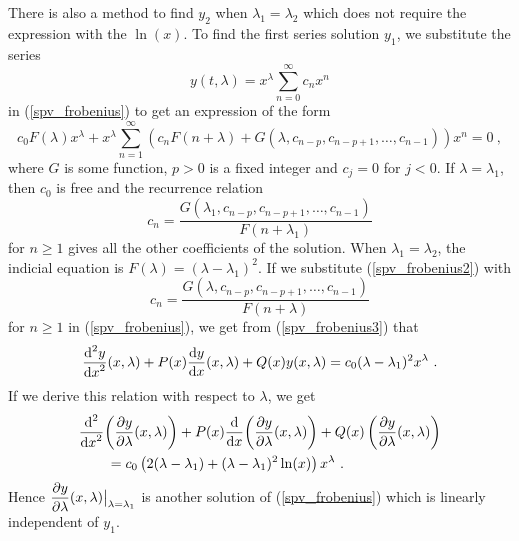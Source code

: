 There is also a method to find $y_2$ when $\lambda_1=\lambda_2$ which
does not require the expression with the $\ln(x)$.  To find the
first series solution $y_1$, we substitute the series
\begin{equation} \label{spv_frobenius2}
y(t,\lambda) = x^\lambda \sum_{n=0}^\infty c_n x^n 
\end{equation}
in (\ref{spv_frobenius}) to get an expression of the form
\begin{equation} \label{spv_frobenius3}
c_0 F(\lambda) x^\lambda + x^\lambda \sum_{n=1}^\infty
\left(c_n F(n+\lambda) +
G(\lambda,c_{n-p},c_{n-p+1},\ldots,c_{n-1})\right) x^n = 0 \  ,
\end{equation}
where $G$ is some function, $p>0$ is a fixed integer and $c_j = 0$ for
$j<0$.  If $\lambda=\lambda_1$, then $c_0$ is free and the recurrence
relation
\[
c_n = \frac{G(\lambda_1,c_{n-p},c_{n-p+1},\ldots,c_{n-1})}
{F(n+\lambda_1)}
\]
for $n\geq 1$ gives all the other coefficients of the solution.  When
$\lambda_1=\lambda_2$, the indicial equation is
$\displaystyle F(\lambda) = (\lambda-\lambda_1)^2$.  If we substitute
(\ref{spv_frobenius2}) with
\[
c_n = \frac{G(\lambda,c_{n-p},c_{n-p+1},\ldots,c_{n-1})}{F(n+\lambda)}
\]
for $n \geq 1$ in (\ref{spv_frobenius}), we get from
(\ref{spv_frobenius3}) that
\[
\dydxn{y}{x}{2}(x,\lambda) + P(x) \dydx{y}{x}(x,\lambda)
+ Q(x) y(x,\lambda) = c_0(\lambda-\lambda_1)^2x^{\lambda} \ .
\]
If we derive this relation with respect to $\lambda$, we get
\begin{align*}
& \dfdxn{\left( \pdydx{y}{\lambda}(x,\lambda) \right)}{x}{2}
+ P(x) \dfdx{\left( \pdydx{y}{\lambda}(x,\lambda) \right)}{x}
+ Q(x) \left( \pdydx{y}{\lambda}(x,\lambda) \right) \\
&\qquad = c_0\left(2(\lambda-\lambda_1) + (\lambda-\lambda_1)^2\ln(x)\right)
x^{\lambda} \ .
\end{align*}
Hence $\displaystyle \pdydx{y}{\lambda}(x,\lambda)\big|_{\lambda=\lambda_1}$
is another solution of (\ref{spv_frobenius}) which is linearly
independent of $y_1$.


